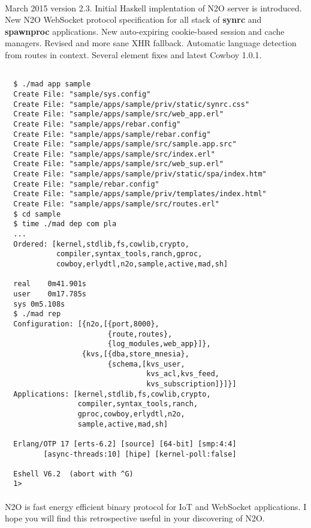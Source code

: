 \paragraph{}
March 2015 version 2.3. Initial Haskell implentation of N2O server is introduced.
New N2O WebSocket protocol specification for all stack of {\bf synrc} and {\bf spawnproc} applications.
New auto-expiring cookie-based session and cache managers. Revised and more sane XHR fallback.
Automatic language detection from routes in context.
Several element fixes and latest Cowboy 1.0.1.

\newpage
\begin{lstlisting}[caption=Bootstraping in a minute]

  $ ./mad app sample
  Create File: "sample/sys.config"
  Create File: "sample/apps/sample/priv/static/synrc.css"
  Create File: "sample/apps/sample/src/web_app.erl"
  Create File: "sample/apps/rebar.config"
  Create File: "sample/apps/sample/rebar.config"
  Create File: "sample/apps/sample/src/sample.app.src"
  Create File: "sample/apps/sample/src/index.erl"
  Create File: "sample/apps/sample/src/web_sup.erl"
  Create File: "sample/apps/sample/priv/static/spa/index.htm"
  Create File: "sample/rebar.config"
  Create File: "sample/apps/sample/priv/templates/index.html"
  Create File: "sample/apps/sample/src/routes.erl"
  $ cd sample
  $ time ./mad dep com pla
  ...
  Ordered: [kernel,stdlib,fs,cowlib,crypto,
            compiler,syntax_tools,ranch,gproc,
            cowboy,erlydtl,n2o,sample,active,mad,sh]

  real    0m41.901s
  user    0m17.785s
  sys 0m5.108s
  $ ./mad rep
  Configuration: [{n2o,[{port,8000},
                        {route,routes},
                        {log_modules,web_app}]},
                  {kvs,[{dba,store_mnesia},
                        {schema,[kvs_user,
                                 kvs_acl,kvs_feed,
                                 kvs_subscription]}]}]
  Applications: [kernel,stdlib,fs,cowlib,crypto,
                 compiler,syntax_tools,ranch,
                 gproc,cowboy,erlydtl,n2o,
                 sample,active,mad,sh]

  Erlang/OTP 17 [erts-6.2] [source] [64-bit] [smp:4:4]
         [async-threads:10] [hipe] [kernel-poll:false]

  Eshell V6.2  (abort with ^G)
  1>
\end{lstlisting}

\paragraph{}
N2O is fast energy efficient binary protocol for IoT and WebSocket applications.
I hope you will find this retrospective useful in your discovering of N2O.

